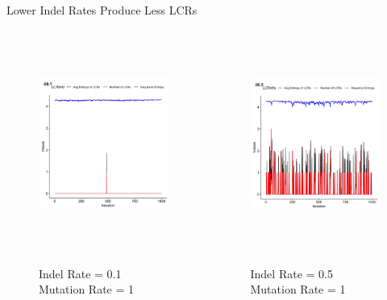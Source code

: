 \documentclass{beamer}
\begin{document}
	\begin{frame}{Lower Indel Rates Produce Less LCRs}
		\begin{columns}	
			\centering
			\begin{figure}
					\includegraphics[height=6cm, width=6cm]{ind_figures/ii0.1} \\~\\
				\caption{\centering Indel Rate = 0.1 Mutation Rate = 1}
			\end{figure} \pause
			
			\centering
			\begin{figure}
				\includegraphics[height=6cm, width=6cm]{ind_figures/ii0.5} \\~\\
				\caption{\centering Indel Rate = 0.5 Mutation Rate = 1}
			\end{figure}
			
		\end{columns}

	\end{frame}
\end{document}
